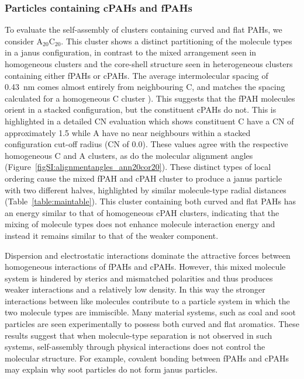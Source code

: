 \subsubsection{Particles containing cPAHs and fPAHs}
To evaluate the self-assembly of clusters containing curved and flat PAHs, we consider $\text{A}_{\text{20}}\text{C}_{\text{20}}$. This cluster shows a distinct partitioning of the molecule types in a janus configuration, in contrast to the mixed arrangement seen in homogeneous clusters and the core-shell structure seen in heterogeneous clusters containing either fPAHs or cPAHs. The average intermolecular spacing of 0.43~nm comes almost entirely from neighbouring C, and matches the spacing calculated for a homogeneous C cluster \cite{chen2014phase}). This suggests that the fPAH molecules orient in a stacked configuration, but the constituent cPAHs do not. This is highlighted in a detailed CN evaluation which shows constituent C have a CN of approximately 1.5 while A have no near neighbours within a stacked configuration cut-off radius (CN of 0.0). These values agree with the respective homogeneous C and A clusters, as do the molecular alignment angles (Figure~\ref{figSI:alignmentangles_ann20cor20}). These distinct types of local ordering cause the mixed fPAH and cPAH cluster to produce a janus particle with two different halves, highlighted by similar molecule-type radial distances (Table~\ref{table:maintable}). This cluster containing both curved and flat PAHs has an energy similar to that of homogeneous cPAH clusters, indicating that the mixing of molecule types does not enhance molecule interaction energy and instead it remains similar to that of the weaker component.

Dispersion and electrostatic interactions dominate the attractive forces between homogeneous interactions of fPAHs and cPAHs. However, this mixed molecule system is hindered by sterics and mismatched polarities and thus produces weaker interactions and a relatively low density. In this way the stronger interactions between like molecules contribute to a particle system in which the two molecule types are immiscible. Many material systems, such as coal and soot particles are seen experimentally to possess both curved and flat aromatics. These results suggest that when molecule-type separation is not observed in such systems, self-assembly through physical interactions does not control the molecular structure. For example, covalent bonding between fPAHs and cPAHs may explain why soot particles do not form janus particles.
%


